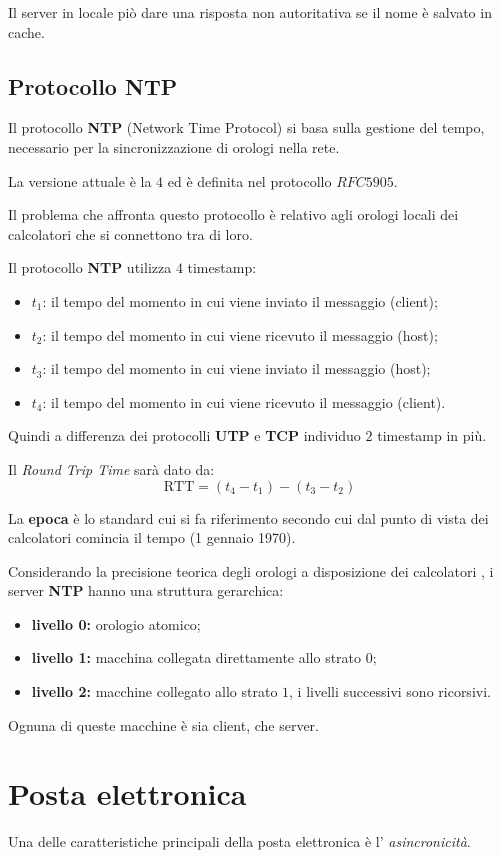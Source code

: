 Il server in locale piò dare una risposta non autoritativa se il nome è
salvato in cache.

\section{Protocollo NTP}
Il protocollo \textbf{NTP} (Network Time Protocol) si basa sulla gestione del
tempo, necessario per la sincronizzazione di orologi nella rete.

La versione attuale è la $4$ ed è definita nel protocollo $RFC5905$.


Il problema che affronta questo protocollo è relativo agli orologi locali dei
calcolatori che si connettono tra di loro.


Il protocollo \textbf{NTP} utilizza $4$ timestamp:
\begin{itemize}
  \item $t_1$: il tempo del momento in cui viene inviato il messaggio
    (client);
  \item $t_2$: il tempo del momento in cui viene ricevuto il messaggio
    (host);
  \item $t_3$: il tempo del momento in cui viene inviato il messaggio
    (host);
  \item $t_4$: il tempo del momento in cui viene ricevuto il messaggio
    (client).
\end{itemize}

Quindi a differenza dei protocolli \textbf{UTP} e \textbf{TCP} individuo $2$
timestamp in più.

Il \emph{Round Trip Time} sarà dato da:
\[
  \text{RTT}=(t_4-t_1)-(t_3-t_2)
\]


La \textbf{epoca} è lo standard cui si fa riferimento secondo cui dal punto
di vista dei calcolatori comincia il tempo (1 gennaio 1970).

Considerando la precisione teorica degli orologi a disposizione dei calcolatori
, i server \textbf{NTP} hanno una struttura gerarchica:
\begin{itemize}
  \item \textbf{livello 0:} orologio atomico;
  \item \textbf{livello 1:} macchina collegata direttamente allo strato $0$;
  \item \textbf{livello 2:} macchine collegato allo strato $1$, i livelli
    successivi sono ricorsivi.
\end{itemize}
Ognuna di queste macchine è sia client, che server.

\chapter{Posta elettronica}
Una delle caratteristiche principali della posta elettronica è l' \textit{
asincronicità}.

